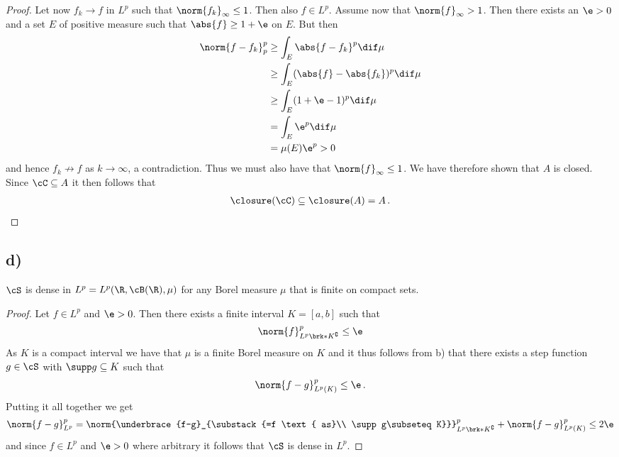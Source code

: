 \begin{proof}
Let now $f_k\to f$ in $L^p$ such that $\norm{f_k}_\infty\leq 1$. Then also $f\in L^p$. Assume now that $\norm{f}_\infty>1$. Then there exists an $\e>0$ and a set $E$ of positive measure such that $\abs{f}\geq 1+\e$ on $E$. But then
\begin{align*}
	\norm{f-f_k}_p^p
	&\geq \int_E\abs{f-f_k}^p\dif\mu  \\
	&\geq \int_E(\abs{f}-\abs{f_k})^p\dif\mu \\
	&\geq \int_E(1+\e-1)^p\dif\mu \\
	&= \int_E\e^p\dif\mu \\
	&= \mu(E)\e^p>0
\end{align*}
and hence $f_k\not\to f$ as $k\to\infty$, a contradiction. Thus we must also have that $\norm{f}_\infty\leq 1$. We have therefore shown that $A$ is closed. Since $\cC\subseteq A$ it then follows that
\begin{align*}
	\closure(\cC)\subseteq \closure(A)=A\,.
\end{align*}
\end{proof}

\subsection{d)}
\begin{claim}
$\cS$ is dense in $L^p=L^p(\R,\cB(\R),\mu)$ for any Borel measure $\mu$ that is finite on compact sets.
\end{claim}
\begin{proof}
Let $f\in L^p$ and $\e>0$. Then there exists a finite interval $K=[a,b]$ such that
\begin{align*}
	\norm{f}_{L^p\brk*{K^\complement}}^p\leq\e
\end{align*}
As $K$ is a compact interval we have that $\mu$ is a finite Borel measure on $K$ and it thus follows from b) that there exists a step function $g\in\cS$ with $\supp g\subseteq K$ such that
\begin{align*}
	\norm{f-g}_{L^p(K)}^p\leq \e\,.
\end{align*}
Putting it all together we get
\begin{align*}
	\norm{f-g}_{L^p}^p
	= \norm{\underbrace{f-g}_{\substack{=f \text{ as}\\ \supp g\subseteq K}}}_{L^p\brk*{K^\complement}}^p +\norm{f-g}_{L^p(K)}^p
	\leq 2\e
\end{align*}
and since $f\in L^p$ and $\e>0$ where arbitrary it follows that $\cS$ is dense in $L^p$.

\end{proof}

